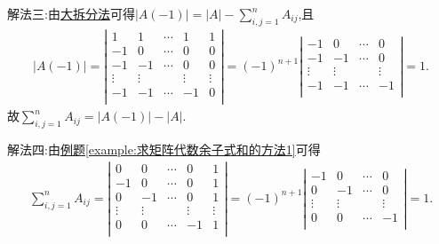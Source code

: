 \documentclass[../../main.tex]{subfiles}%
\begin{document}
\begin{solution}
{\color{blue}解法三:}由\hyperref[大拆分法]{大拆分法}可得$\left| A\left( -1 \right) \right|=\left| A \right|-\sum_{i,j=1}^n{A_{ij}}$,且
\begin{align*}
\left| A\left( -1 \right) \right|=\left| \begin{matrix}
1&		1&		\cdots&		1&		1\\
-1&		0&		\cdots&		0&		0\\
-1&		-1&		\cdots&		0&		0\\
\vdots&		\vdots&		&		\vdots&		\vdots\\
-1&		-1&		\cdots&		-1&		0\\
\end{matrix} \right|=\left( -1 \right) ^{n+1}\left| \begin{matrix}
-1&		0&		\cdots&		0\\
-1&		-1&		\cdots&		0\\
\vdots&		\vdots&		&		\vdots\\
-1&		-1&		\cdots&		-1\\
\end{matrix} \right|=1.
\end{align*}
故$\sum_{i,j=1}^n{A_{ij}}=\left| A\left( -1 \right) \right|-\left| A \right|$.

{\color{blue}解法四:}由\hyperref[example:求矩阵代数余子式和的方法1]{例题\ref{example:求矩阵代数余子式和的方法1}}可得
\begin{align*}
\sum_{i,j=1}^n{A_{ij}}=\left| \begin{matrix}
0&		0&		\cdots&		0&		1\\
-1&		0&		\cdots&		0&		1\\
0&		-1&		\cdots&		0&		1\\
\vdots&		\vdots&		&		\vdots&		\vdots\\
0&		0&		\cdots&		-1&		1\\
\end{matrix} \right|=(-1)^{n+1}\left| \begin{matrix}
-1&		0&		\cdots&		0\\
0&		-1&		\cdots&		0\\
\vdots&		\vdots&		&		\vdots\\
0&		0&		\cdots&		-1\\
\end{matrix} \right|=1.
\end{align*}

\end{solution}
\end{document}

